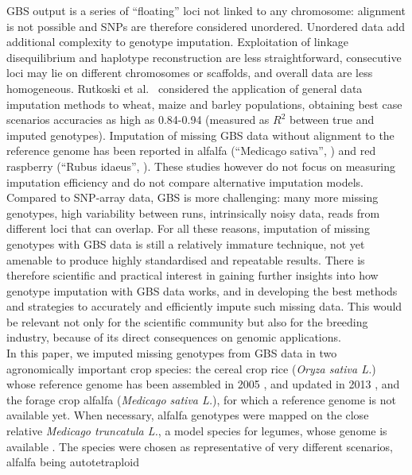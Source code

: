 GBS output is a series of ``floating'' loci not linked to any chromosome:
alignment is not possible and SNPs are therefore considered unordered. Unordered 
data add additional complexity to genotype imputation. Exploitation of linkage 
disequilibrium and haplotype reconstruction 
are less straightforward, consecutive loci may lie on different chromosomes
or scaffolds, and overall data are less homogeneous.
Rutkoski et al.~\cite{rutkoski_imputation_2013}
considered the application of general data imputation methods 
to wheat, maize and barley populations, obtaining best case scenarios accuracies 
as high as 0.84-0.94 (measured as $R^{2}$ between true and imputed genotypes).
Imputation of missing GBS data without alignment to the reference genome has
been reported in alfalfa (``Medicago sativa'', \cite{Rocher_validation_2015})
and red raspberry (``Rubus idaeus'', \cite{ward_saturated_2013}). These studies
however do not focus on measuring imputation efficiency and do not compare
alternative imputation models.\\
	Compared to SNP-array data, GBS is more challenging: many more 
	missing genotypes, high variability between runs, intrinsically noisy data, 
	reads from different loci that can overlap. For all these reasons, imputation 
	of missing genotypes with GBS data is still a relatively immature technique, 
	not yet amenable to produce highly standardised and repeatable results. 
There is therefore scientific and practical interest in gaining further 
insights into how genotype imputation with GBS data works, and in 
developing the best methods and strategies to accurately and efficiently 
impute such missing data. This would be relevant not only for the scientific 
community but also for the breeding industry, because of its direct 
consequences on genomic applications.\\
In this paper, we imputed missing genotypes from GBS data in two agronomically
important crop species:
the cereal crop rice (\emph{Oryza sativa L.}) whose reference genome has been 
assembled in 2005 \cite{international_rice_genome_sequencing_project_map-based_2005},
and updated in 2013 \cite{kawahara_improvement_2013},
and
the forage crop alfalfa (\emph{Medicago sativa L.}), for 
which a reference genome is not available yet. When necessary, alfalfa genotypes
were mapped on the close relative \emph{Medicago truncatula L.}, a model species
for legumes, whose genome is available \cite{young_medicago_2011}.
The species were chosen 
as representative of very different scenarios, alfalfa being autotetraploid
